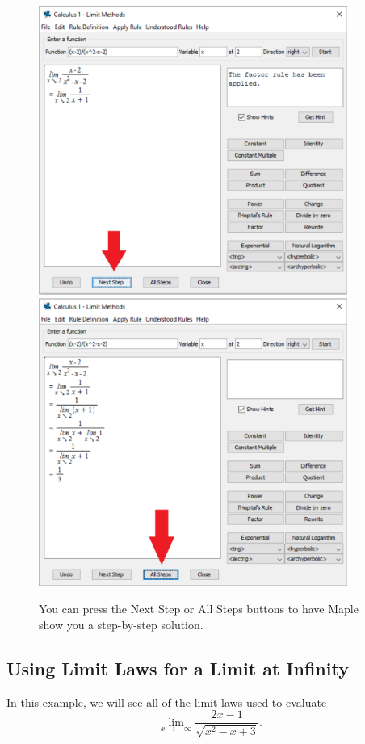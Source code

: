 \begin{figure}[h]
\caption{You can press the Next Step or All Steps buttons to have Maple show you a step-by-step solution.}
\centering
\includegraphics[width=0.9\textwidth]{tutorials/figures/LimitTutorQ1-2-eps-converted-to.pdf}
\includegraphics[width=0.9\textwidth]{tutorials/figures/LimitTutorQ1-3-eps-converted-to.pdf}
\end{figure}
\newpage

\clearpage

\subsection{Using Limit Laws for a Limit at Infinity}
In this example, we will see all of the limit laws used to evaluate \[ \displaystyle\lim_{x \rightarrow -\infty} \frac{2x-1}{\sqrt{x^2-x+3}}. \]

